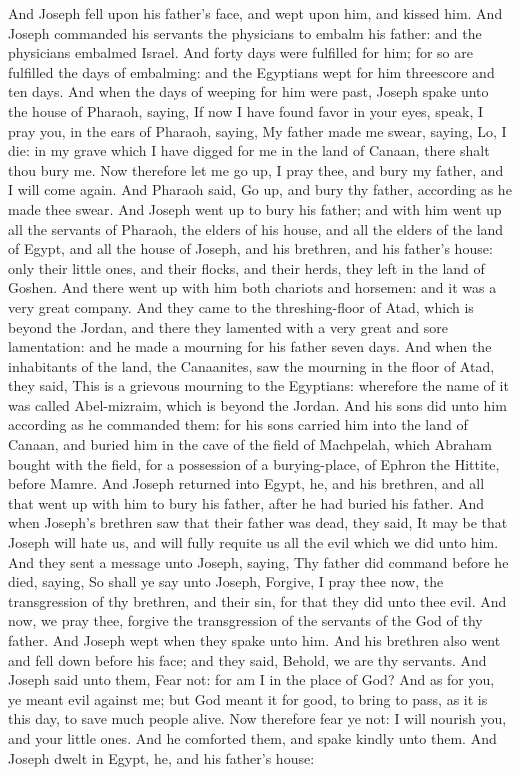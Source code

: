 And Joseph fell upon his father’s face, and wept upon him, and kissed him. And Joseph commanded his servants the physicians to embalm his father: and the physicians embalmed Israel. And forty days were fulfilled for him; for so are fulfilled the days of embalming: and the Egyptians wept for him threescore and ten days.  And when the days of weeping for him were past, Joseph spake unto the house of Pharaoh, saying, If now I have found favor in your eyes, speak, I pray you, in the ears of Pharaoh, saying, My father made me swear, saying, Lo, I die: in my grave which I have digged for me in the land of Canaan, there shalt thou bury me. Now therefore let me go up, I pray thee, and bury my father, and I will come again. And Pharaoh said, Go up, and bury thy father, according as he made thee swear. And Joseph went up to bury his father; and with him went up all the servants of Pharaoh, the elders of his house, and all the elders of the land of Egypt, and all the house of Joseph, and his brethren, and his father’s house: only their little ones, and their flocks, and their herds, they left in the land of Goshen. And there went up with him both chariots and horsemen: and it was a very great company. And they came to the threshing-floor of Atad, which is beyond the Jordan, and there they lamented with a very great and sore lamentation: and he made a mourning for his father seven days. And when the inhabitants of the land, the Canaanites, saw the mourning in the floor of Atad, they said, This is a grievous mourning to the Egyptians: wherefore the name of it was called Abel-mizraim, which is beyond the Jordan. And his sons did unto him according as he commanded them: for his sons carried him into the land of Canaan, and buried him in the cave of the field of Machpelah, which Abraham bought with the field, for a possession of a burying-place, of Ephron the Hittite, before Mamre. And Joseph returned into Egypt, he, and his brethren, and all that went up with him to bury his father, after he had buried his father.  And when Joseph’s brethren saw that their father was dead, they said, It may be that Joseph will hate us, and will fully requite us all the evil which we did unto him. And they sent a message unto Joseph, saying, Thy father did command before he died, saying, So shall ye say unto Joseph, Forgive, I pray thee now, the transgression of thy brethren, and their sin, for that they did unto thee evil. And now, we pray thee, forgive the transgression of the servants of the God of thy father. And Joseph wept when they spake unto him. And his brethren also went and fell down before his face; and they said, Behold, we are thy servants. And Joseph said unto them, Fear not: for am I in the place of God? And as for you, ye meant evil against me; but God meant it for good, to bring to pass, as it is this day, to save much people alive. Now therefore fear ye not: I will nourish you, and your little ones. And he comforted them, and spake kindly unto them.  And Joseph dwelt in Egypt, he, and his father’s house: 